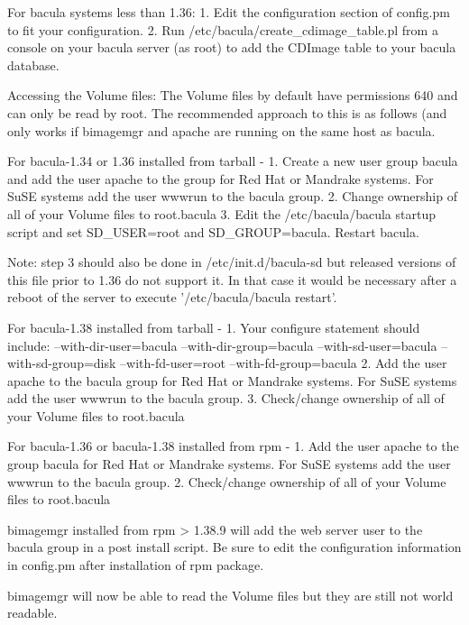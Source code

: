 For bacula systems less than 1.36:
1. Edit the configuration section of config.pm to fit your configuration.
2. Run /etc/bacula/create\_cdimage\_table.pl from a console on your bacula
server (as root) to add the CDImage table to your bacula database.

Accessing the Volume files:
The Volume files by default have permissions 640 and can only be read by root. 
The recommended approach to this is as follows (and only works if bimagemgr and 
apache are running on the same host as bacula.

For bacula-1.34 or 1.36 installed from tarball -
1. Create a new user group bacula and add the user apache to the group for 
Red Hat or Mandrake systems. For SuSE systems add the user wwwrun to the 
bacula group.
2. Change ownership of all of your Volume files to root.bacula
3. Edit the /etc/bacula/bacula startup script and set SD\_USER=root and 
SD\_GROUP=bacula. Restart bacula.

Note: step 3 should also be done in /etc/init.d/bacula-sd but released versions
of this file prior to 1.36 do not support it. In that case it would be necessary after 
a reboot of the server to execute '/etc/bacula/bacula restart'.

For bacula-1.38 installed from tarball -
1. Your configure statement should include:
	--with-dir-user=bacula
        --with-dir-group=bacula
        --with-sd-user=bacula
        --with-sd-group=disk
        --with-fd-user=root
        --with-fd-group=bacula
2. Add the user apache to the bacula group for Red Hat or Mandrake systems. 
For SuSE systems add the user wwwrun to the bacula group.
3. Check/change ownership of all of your Volume files to root.bacula

For bacula-1.36 or bacula-1.38 installed from rpm -
1. Add the user apache to the group bacula for Red Hat or Mandrake systems. 
For SuSE systems add the user wwwrun to the bacula group.
2. Check/change ownership of all of your Volume files to root.bacula

bimagemgr installed from rpm > 1.38.9 will add the web server user to the 
bacula group in a post install script. Be sure to edit the configuration 
information in config.pm after installation of rpm package.

bimagemgr will now be able to read the Volume files but they are still not 
world readable.

